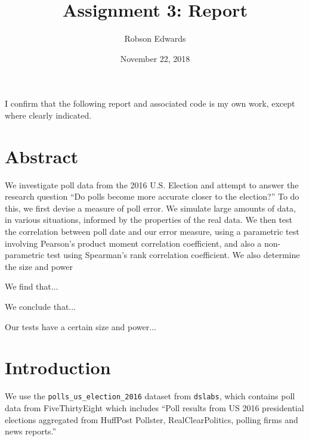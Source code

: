 \documentclass[11pt, oneside]{article}
\title{Assignment 3: Report}
\author{Robson Edwards}
\date{November 22, 2018}
\newcommand \Rcode[1]{{\texttt{\colorbox{codegray}{#1}}}}
\begin{document}
\maketitle

I confirm that the following report and associated code is my own work, except where clearly indicated.


\section*{Abstract}

We investigate poll data from the 2016 U.S. Election and attempt to answer the research question ``Do polls become more accurate closer to the election?'' 
To do this, we first devise a measure of poll error. 
We simulate large amounts of data, in various situations, informed by the properties of the real data. 
We then test the correlation between poll date and our error measure, using a parametric test involving Pearson's product moment correlation coefficient, and also a non-parametric test using Spearman's rank correlation coefficient. \cite{R}
We also determine the size and power 

We find that... %

We conclude that... %

Our tests have a certain size and power... %

\section{Introduction}

We use the \Rcode{polls\_us\_election\_2016} dataset from \Rcode{dslabs}, which contains poll data from FiveThirtyEight which includes ``Poll results from US 2016 presidential elections aggregated from HuffPost Pollster, RealClearPolitics, polling firms and news reports.'' \cite{dslabs}

\end{document}
